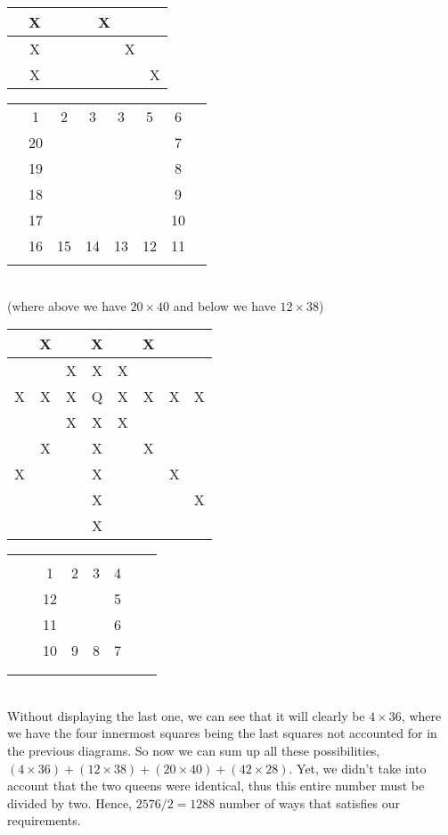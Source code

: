 \documentclass[12pt]{article}
\begin{document}
\begin{enumerate}
\begin{enumerate}
\begin{tabular}{|c|c|c|c|c|c|c|c|}
&X& && &X& & \\
 \hline
&X& && &&X & \\
 \hline
&X&&&&&&X\\
\hline
\end{tabular} \begin{tabular}{|c|c|c|c|c|c|c|c|}
\hline
 &&&&&&& \\
 \hline
&1&2&3&3&5&6& \\
 \hline
&20&&& &&7& \\
 \hline
&19&&&&&8& \\
 \hline
&18& && &&9& \\
 \hline
&17& && &&10& \\
 \hline
&16&15&14&13&12&11& \\
 \hline
&&&&&&& \\
\hline
\end{tabular} \\
(where above we have $20 \times 40$ and below we have $12 \times 38$) \\
\begin{tabular}{|c|c|c|c|c|c|c|c|}
\hline
 &X& &X& &X& & \\
 \hline
 & &X&X&X& & & \\
 \hline
 X&X&X&Q&X&X&X&X\\
 \hline
 & &X&X&X& & & \\
 \hline
 &X& &X& &X& & \\
 \hline
 X& & &X& & &X& \\
 \hline
 & & &X& & & &X\\
 \hline
 & & &X& & & & \\
\hline
\end{tabular} \begin{tabular}{|c|c|c|c|c|c|c|c|}
\hline
&&&&&&& \\
 \hline
&& && && & \\
 \hline
&&1&2&3&4& & \\
 \hline
&&12&&&5& & \\
 \hline
&&11&& &6& & \\
 \hline
&&10&9&8&7& & \\
 \hline
&& && && & \\
 \hline
&&&&&&& \\
\hline
\end{tabular} \\
Without displaying the last one, we can see that it will clearly be $4 \times 36$, where we have
the four innermost squares being the last squares not accounted for in the previous diagrams. So now
we can sum up all these possibilities, $(4 \times 36) + (12 \times 38) + (20 \times 40) + (42 \times 28)$. 
Yet, we didn't take into account that the two queens were identical, thus this entire number must be
divided by two. Hence, $2576/2 = 1288$ number of ways that satisfies our requirements.
\end{enumerate}


\end{enumerate}
\end{document}
